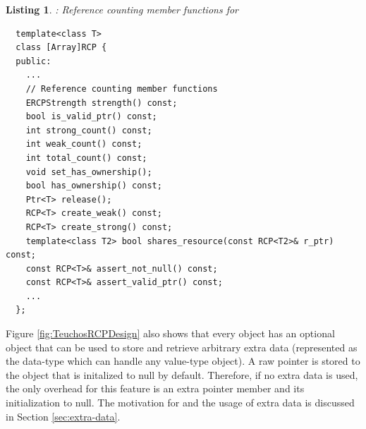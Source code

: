 \documentclass[pdf,ps2pdf,11pt]{SANDreport}
\newtheorem{listing}{Listing}
\begin{document}
\begin{listing}: Reference counting member functions for {}
{} \\
\label{listing:ref-count-mem-funcs}
{\small\begin{verbatim}
  template<class T>
  class [Array]RCP {
  public:
    ...
    // Reference counting member functions
    ERCPStrength strength() const;
    bool is_valid_ptr() const;
    int strong_count() const;
    int weak_count() const;
    int total_count() const;
    void set_has_ownership();
    bool has_ownership() const;
    Ptr<T> release();
    RCP<T> create_weak() const;
    RCP<T> create_strong() const;
    template<class T2> bool shares_resource(const RCP<T2>& r_ptr) const;
    const RCP<T>& assert_not_null() const;
    const RCP<T>& assert_valid_ptr() const;
    ...
  };
\end{verbatim}}
\end{listing}


Figure {}\ref{fig:TeuchosRCPDesign} also shows that every
{} object has an optional {} object
that can be used to store and retrieve arbitrary extra data
(represented as the {} data-type which can handle any
value-type object).  A raw pointer is stored to the
{} object that is initalized to null by
default.  Therefore, if no extra data is used, the only overhead for
this feature is an extra pointer member and its initialization to
null.  The motivation for and the usage of extra data is discussed in
Section {}\ref{sec:extra-data}.
\end{document}
